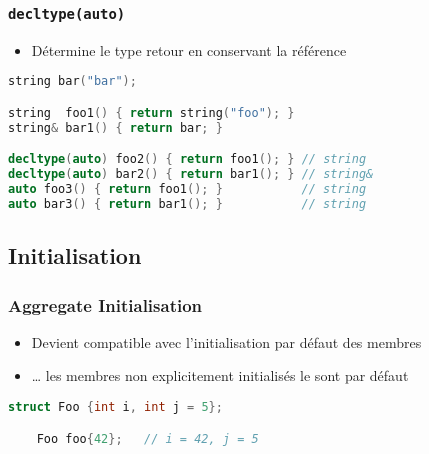 \documentclass[C++.tex]{subfiles}
\begin{document}
\begin{frame}[fragile]
	\frametitle{\lstinline|decltype(auto)|}
	\begin{itemize}
		\item Détermine le type retour en conservant la référence
	\end{itemize}

	\begin{lstlisting}[language=C++]
string bar("bar");

string  foo1() { return string("foo"); }
string& bar1() { return bar; }

decltype(auto) foo2() { return foo1(); } // string
decltype(auto) bar2() { return bar1(); } // string&
auto foo3() { return foo1(); }           // string
auto bar3() { return bar1(); }           // string\end{lstlisting}
\end{frame}

\subsection*{Initialisation}
\begin{frame}[fragile]
	\frametitle{Aggregate Initialisation}
	\begin{itemize}
		\item Devient compatible avec l'initialisation par défaut des membres
		\item \ldots{} les membres non explicitement initialisés le sont par défaut
	\end{itemize}

	\begin{lstlisting}[language=C++]
	struct Foo {int i, int j = 5};

	Foo foo{42};   // i = 42, j = 5\end{lstlisting}
\end{frame}
\end{document}
